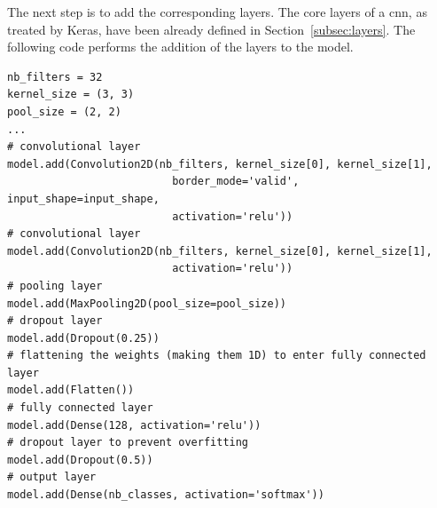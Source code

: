 The next step is to add the corresponding layers. The core layers of a \gls{cnn}, as treated by Keras, have been already defined in Section~\ref{subsec:layers}. The following code performs the addition of the layers to the model.
\begin{lstlisting}
nb_filters = 32
kernel_size = (3, 3)
pool_size = (2, 2)
...
# convolutional layer
model.add(Convolution2D(nb_filters, kernel_size[0], kernel_size[1],
                          border_mode='valid', input_shape=input_shape, 
                          activation='relu'))
# convolutional layer
model.add(Convolution2D(nb_filters, kernel_size[0], kernel_size[1],
                          activation='relu'))
# pooling layer
model.add(MaxPooling2D(pool_size=pool_size))
# dropout layer
model.add(Dropout(0.25))
# flattening the weights (making them 1D) to enter fully connected layer
model.add(Flatten())
# fully connected layer
model.add(Dense(128, activation='relu'))
# dropout layer to prevent overfitting
model.add(Dropout(0.5))
# output layer
model.add(Dense(nb_classes, activation='softmax'))
\end{lstlisting}

